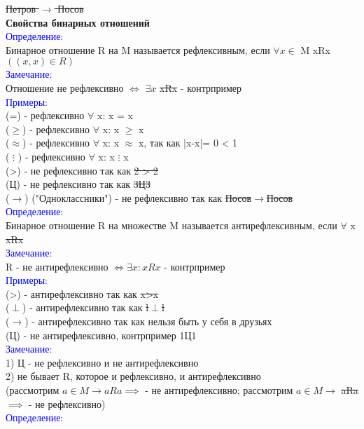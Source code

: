 \documentclass[a4paper,12pt]{article}   %
\begin{document}
\sout{Петров $\rightarrow$ Посов} \\
\textbf{Свойства бинарных отношений} \\
\textcolor{blue}{Определение:} \\
Бинарное отношение R на M называется рефлексивным, если $\forall x \in$ M xRx $((x,x) \in R)$ \\ 
\textcolor{blue}{Замечание:} \\
Отношение не рефлексивно $\iff$ $\exists x$ \sout{xRx} - контрпример \\ 
\textcolor{blue}{Примеры:} \\
(=) - рефлексивно $\forall$ x: x = x \\
($\geq$) - рефлексивно $\forall$ x: x $\geq$ x \\
($\approx$) - рефлексивно $\forall$ x: x $\approx$ x, так как |x-x|= 0 < 1 \\
( $\vdots$ ) - рефлексивно $\forall$ x: x $\vdots$ x \\
(>) - не рефлексивно так как \sout{2 > 2} \\
(Ц) - не рефлексивно так как \sout{3Ц3} \\
($\to$) ("Одноклассники") - не рефлексивно так как \sout{Посов$\to$Посов} \\
\textcolor{blue}{Определение:} \\
Бинарное отношение R на множестве M называется антирефлексивным, если $\forall$ x \sout{xRx} \\
\textcolor{blue}{Замечание:} \\
R - не антирефлексивно $\iff \exists x: xRx$ - контрпример \\ 
\textcolor{blue}{Примеры:} \\
(>) - антирефлексивно так как \sout{x>x} \\
($\perp$) - антирефлексивно так как \sout{l$\perp$l} \\
($\to$) - антирефлексивно так как нельзя быть у себя в друзьях \\
(Ц) - не антирефлексивно, контрпример 1Ц1 \\
\textcolor{blue}{Замечание:} \\
1) Ц - не рефлексивно и не антирефлексивно \\
2) не бывает R, которое и рефлексивно, и антирефлексивно \\
(рассмотрим $a \in M \to aRa \implies$ - не антирефлексивно; рассмотрим $a \in M \to$ \sout{aRa} $\implies$ - не рефлексивно) \\
\textcolor{blue}{Определение:} \\
\end{document}
